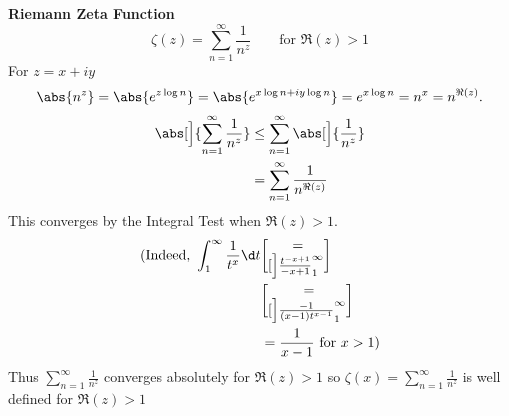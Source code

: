 \textbf{Riemann Zeta Function}
\[ \zeta(z) = \sum_{n=1}^\infty\frac{1}{n^z} \qquad \text{for $\Re(z)>1$} \]
For $z=x+iy$
\[ \abs{n^z} = \abs{e^{z\log n}} = \abs{e^{x\log n+iy\log n}} = e^{x\log n} = n^x = n^{\Re(z)} . \]
\begin{align*}
\abs[\Big]{\sum_{n=1}^\infty\frac{1}{n^z}} &\leq \sum_{n=1}^\infty\abs[\Big]{\frac{1}{n^z}} \\
&= \sum_{n=1}^\infty \frac{1}{n^{\Re(z)}}
\end{align*}
This converges by the Integral Test when $\Re(z)>1$.
\begin{align*}
\text{(Indeed, } \int_1^\infty\frac{1}{t^x}\d t &= \brack[\Big]{\frac{t^{-x+1}}{-x+1}}_1^\infty \\
&= \brack[\Big]{\frac{-1}{(x-1)t^{x-1}}}_1^\infty \\
&= \frac{1}{x-1} \text{ for $x>1$)}
\end{align*}
Thus $\sum_{n=1}^\infty\frac{1}{n^z}$ converges absolutely for $\Re(z)>1$ so $\zeta(x)=\sum_{n=1}^\infty\frac1{n^z}$ is well defined for $\Re(z)>1$

